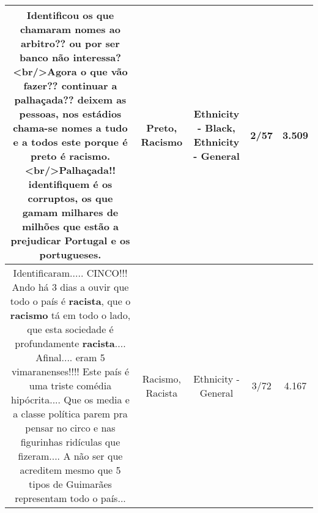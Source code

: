 \documentclass[11pt]{article}
\newlength\mylength
\begin{document}
\begin{center}
\begin{longtable}{|C{.65\mylength}|C{.30\mylength}|C{.12\mylength}|C{.12\mylength}|C{.12\mylength}|}
  \small Identificou os que chamaram nomes ao arbitro?? ou por ser banco não interessa?<br/>Agora o que vão fazer?? continuar a palhaçada?? deixem as pessoas, nos estádios chama-se nomes a tudo e a todos este porque é \textbf{preto} é \textbf{racismo}. <br/>Palhaçada!! identifiquem é os corruptos, os que gamam milhares de milhões que estão a prejudicar Portugal e os portugueses.\normalsize   & Preto, Racismo & Ethnicity - Black, Ethnicity - General & 2/57 & 3.509 \\  \hline
  \small Identificaram..... CINCO!!! Ando há 3 dias a ouvir que todo o país é \textbf{racista}, que o \textbf{racismo} tá em todo o lado, que esta sociedade é profundamente \textbf{racista}.... Afinal.... eram 5 vimaranenses!!!! Este país é uma triste comédia hipócrita.... Que os media e a classe política parem pra pensar no circo e nas figurinhas ridículas que fizeram.... A não ser que acreditem mesmo que 5 tipos de Guimarães representam todo o país...\normalsize   & Racismo, Racista & Ethnicity - General & 3/72 & 4.167 \\  \hline
  
\end{longtable}
\end{center}
\end{document}
